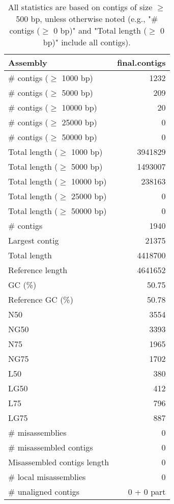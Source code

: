 \documentclass[12pt,a4paper]{article}
\begin{document}
\begin{table}[ht]
\begin{center}
\caption{All statistics are based on contigs of size $\geq$ 500 bp, unless otherwise noted (e.g., "\# contigs ($\geq$ 0 bp)" and "Total length ($\geq$ 0 bp)" include all contigs).}
\begin{tabular}{|l*{1}{|r}|}
\hline
Assembly & final.contigs \\ \hline
\# contigs ($\geq$ 1000 bp) & 1232 \\ \hline
\# contigs ($\geq$ 5000 bp) & 209 \\ \hline
\# contigs ($\geq$ 10000 bp) & 20 \\ \hline
\# contigs ($\geq$ 25000 bp) & 0 \\ \hline
\# contigs ($\geq$ 50000 bp) & 0 \\ \hline
Total length ($\geq$ 1000 bp) & 3941829 \\ \hline
Total length ($\geq$ 5000 bp) & 1493007 \\ \hline
Total length ($\geq$ 10000 bp) & 238163 \\ \hline
Total length ($\geq$ 25000 bp) & 0 \\ \hline
Total length ($\geq$ 50000 bp) & 0 \\ \hline
\# contigs & 1940 \\ \hline
Largest contig & 21375 \\ \hline
Total length & 4418700 \\ \hline
Reference length & 4641652 \\ \hline
GC (\%) & 50.75 \\ \hline
Reference GC (\%) & 50.78 \\ \hline
N50 & 3554 \\ \hline
NG50 & 3393 \\ \hline
N75 & 1965 \\ \hline
NG75 & 1702 \\ \hline
L50 & 380 \\ \hline
LG50 & 412 \\ \hline
L75 & 796 \\ \hline
LG75 & 887 \\ \hline
\# misassemblies & 0 \\ \hline
\# misassembled contigs & 0 \\ \hline
Misassembled contigs length & 0 \\ \hline
\# local misassemblies & 0 \\ \hline
\# unaligned contigs & 0 + 0 part \\ \hline

\end{tabular}
\end{center}
\end{table}
\end{document}
